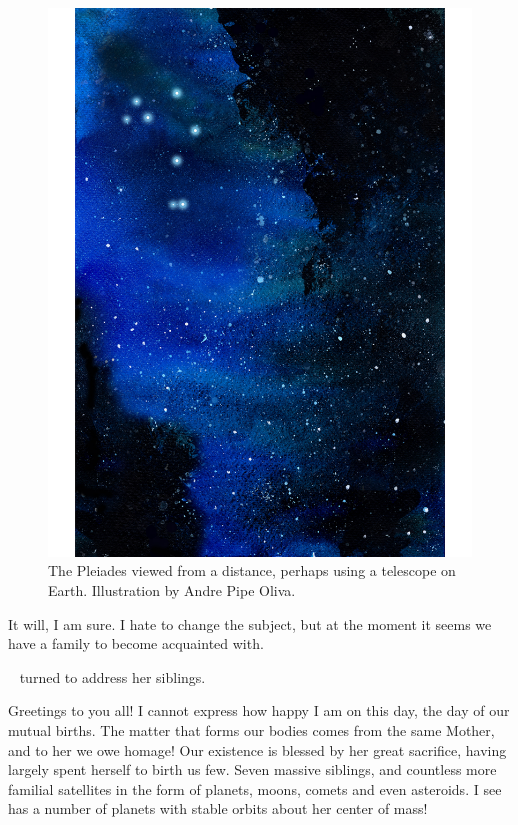 \documentclass[main.tex]{subfiles}
\begin{document}
\begin{figure}
\includegraphics[width=\columnwidth]{ch1_4.pdf}
\caption{The Pleiades viewed from a distance, perhaps using a telescope on Earth.  Illustration by Andre Pipe Oliva.
\label{fig:fig4}}
\end{figure}


\par \Maia It will, I am sure.  I hate to change the subject, but at the moment it seems we have a family to become acquainted with.

\par \nar \rmmaia~ turned to address her siblings.


\par \Maia Greetings to you all!  I cannot express how happy I am on this day, the day of our mutual births.  The matter that forms our bodies comes from the same Mother, and to her we owe homage!  Our existence is blessed by her great sacrifice, having largely spent herself to birth us few.  Seven massive siblings, and countless more familial satellites in the form of planets, moons, comets and even asteroids.  I see \rmelectra has a number of planets with stable orbits about her center of mass!  
\end{document}
